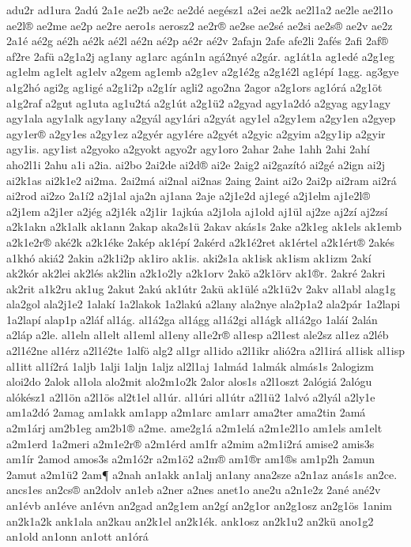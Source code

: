 {adu2r
ad1ura
2adú
2a1e
ae2b
ae2c
ae2dé
aegész1
a2ei
ae2k
ae2l1a2
ae2le
ae2l1o
ae2l®
ae2me
ae2p
ae2re
aero1s
aerosz2
ae2r®
ae2se
ae2sé
ae2si
ae2s®
ae2v
ae2z
2a1é
aé2g
aé2h
aé2k
aé2l
aé2n
aé2p
aé2r
aé2v
2afajn
2afe
afe2li
2afés
2afi
2af®
af2re
2afü
a2g1a2j
ag1any
ag1arc
agán1n
agá2nyé
a2gár.
ag1át1a
ag1edé
a2g1eg
ag1elm
ag1elt
ag1elv
a2gem
ag1emb
a2g1ev
a2g1é2g
a2g1é2l
ag1épí
1agg.
ag3gye
a1g2hó
agi2g
ag1igé
a2g1i2p
a2g1ír
agli2
ago2na
2agor
a2g1ors
ag1órá
a2g1öt
a1g2raf
a2gut
ag1uta
ag1u2tá
a2g1út
a2g1ü2
a2gyad
agy1a2dó
a2gyag
agy1agy
agy1ala
agy1alk
agy1any
a2gyál
agy1ári
a2gyát
agy1el
a2gy1em
a2gy1en
a2gyep
agy1er®
a2gy1es
a2gy1ez
a2gyér
agy1ére
a2gyét
a2gyic
a2gyim
a2gy1ip
a2gyir
agy1is.
agy1ist
a2gyoko
a2gyokt
agyo2r
agy1oro
2ahar
2ahe
1ahh
2ahi
2ahí
aho2l1i
2ahu
a1i
a2ia.
ai2bo
2ai2de
ai2d®
ai2e
2aig2
ai2gazító
ai2gé
a2ign
ai2j
ai2k1as
ai2k1e2
ai2ma.
2ai2má
ai2nal
ai2nas
2aing
2aint
ai2o
2ai2p
ai2ram
ai2rá
ai2rod
ai2zo
2a1í2
a2j1al
aja2n
aj1ana
2aje
a2j1e2d
aj1egé
a2j1elm
aj1e2l®
a2j1em
a2j1er
a2jég
a2j1ék
a2j1ir
1ajkúa
a2j1ola
aj1old
aj1ül
aj2ze
aj2zí
aj2zsí
a2k1akn
a2k1alk
ak1ann
2akap
aka2s1ü
2akav
akás1s
2ake
a2k1eg
ak1els
ak1emb
a2k1e2r®
aké2k
a2k1éke
2akép
ak1épí
2akérd
a2k1é2ret
ak1értel
a2k1ért®
2akés
a1khó
akiá2
2akin
a2k1i2p
ak1iro
ak1is.
aki2s1a
ak1isk
ak1ism
ak1izm
2akí
ak2kór
ak2lei
ak2lés
ak2lin
a2k1o2ly
a2k1orv
2akö
a2k1örv
ak1®r.
2akré
2akri
ak2rit
a1k2ru
ak1ug
2akut
2akú
ak1útr
2akü
ak1ülé
a2k1ü2v
2akv
al1abl
alag1g
ala2gol
ala2j1e2
1alakí
1a2lakok
1a2lakú
a2lany
ala2nye
ala2p1a2
ala2pár
1a2lapi
1a2lapí
alap1p
a2láf
al1ág.
al1á2ga
al1ágg
al1á2gi
al1ágk
al1á2go
1aláí
2alán
a2láp
a2le.
al1eln
al1elt
al1eml
al1eny
al1e2r®
al1esp
a2l1est
ale2sz
al1ez
a2léb
a2l1é2ne
al1érz
a2l1é2te
1alfö
alg2
al1gr
al1ido
a2l1ikr
alió2ra
a2l1irá
al1isk
al1isp
al1itt
al1í2rá
1aljb
1alji
1aljn
1aljz
al2l1aj
1almád
1almák
almás1s
2alogizm
aloi2do
2alok
al1ola
alo2mit
alo2m1o2k
2alor
alos1s
a2l1oszt
2alógiá
2alógu
alókész1
a2l1ön
a2l1ös
al2t1el
al1úr.
al1úri
al1útr
a2l1ü2
1alvó
a2lyál
a2ly1e
am1a2dó
2amag
am1akk
am1app
a2m1arc
am1arr
ama2ter
ama2tin
2amá
a2m1árj
am2b1eg
am2b1®
a2me.
ame2g1á
a2m1elá
a2m1e2l1o
am1els
am1elt
a2m1erd
1a2meri
a2m1e2r®
a2m1érd
am1fr
a2mim
a2m1i2rá
amise2
amis3s
am1ír
2amod
amos3s
a2m1ó2r
a2m1ö2
a2m®
am1®r
am1®s
am1p2h
2amun
2amut
a2m1ü2
2am¶
a2nah
an1akk
an1alj
an1any
ana2sze
a2n1az
anás1s
an2ce.
ancs1es
an2cs®
an2dolv
an1eb
a2ner
a2nes
anet1o
ane2u
a2n1e2z
2ané
ané2v
an1évb
an1éve
an1évn
an2gad
an2g1em
an2gí
an2g1or
an2g1osz
an2g1ös
1anim
an2k1a2k
ank1ala
an2kau
an2k1el
an2k1ék.
ank1osz
an2k1u2
an2kü
ano1g2
an1old
an1onn
an1ott
an1órá
}
